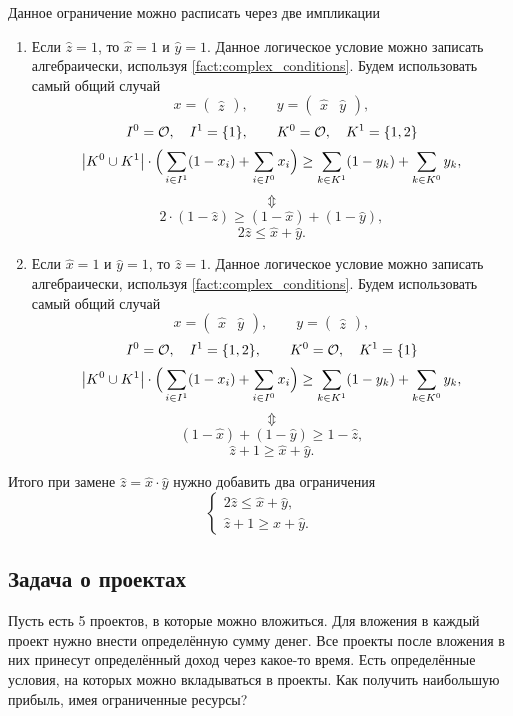 Данное ограничение можно расписать через две импликации
\begin{enumerate}
	\item Если $\hat{z} = 1$, то $\hat{x} = 1$ и $\hat{y} = 1$. Данное логическое условие можно записать алгебраически, используя \cref{fact:complex_conditions}. Будем использовать самый общий случай
	\[
	x = \begin{pmatrix}\hat{z}\end{pmatrix}, \qquad y = \begin{pmatrix} \hat{x} & \hat{y} \end{pmatrix},
	\]
	\[
	I^0 = \mathcal{O}, \quad I^1 = \{1\}, \qquad K^0 = \mathcal{O}, \quad K^1 = \{1, 2\}
	\]
	\[
	\abs{K^0 \cup K^1} \cdot \Big(\sum_{i \in I^1}(1-x_i) + \sum_{i \in I^0}x_i\Big) \ge \sum_{k \in K^1}(1-y_k) + \sum_{k \in K^0}y_k,
	\]	
	\[\Updownarrow\]	
	\[
	2 \cdot (1 - \hat{z}) \ge (1 - \hat{x}) + (1 - \hat{y}),
	\]
	\[
	2\hat{z} \le \hat{x} + \hat{y}.
	\]
	
	\item Если $\hat{x} = 1$ и $\hat{y} = 1$, то $\hat{z} = 1$. Данное логическое условие можно записать алгебраически, используя \cref{fact:complex_conditions}. Будем использовать самый общий случай
	\[
	x = \begin{pmatrix}\hat{x} & \hat{y}\end{pmatrix}, \qquad y = \begin{pmatrix} \hat{z} \end{pmatrix},
	\]
	\[
	I^0 = \mathcal{O}, \quad I^1 = \{1, 2\}, \qquad K^0 = \mathcal{O}, \quad K^1 = \{1\}
	\]
	\[
	\abs{K^0 \cup K^1} \cdot \Big(\sum_{i \in I^1}(1-x_i) + \sum_{i \in I^0}x_i\Big) \ge \sum_{k \in K^1}(1-y_k) + \sum_{k \in K^0}y_k,
	\]
	\[\Updownarrow\]
	\[
	(1 - \hat{x}) + (1 - \hat{y}) \ge 1 - \hat{z},
	\]
	\[
	\hat{z} + 1 \ge \hat{x} + \hat{y}.
	\]
\end{enumerate}

Итого при замене $\hat{z} = \hat{x} \cdot \hat{y}$ нужно добавить два ограничения
\[
\boxed{\begin{cases}
		2\hat{z} \le \hat{x} + \hat{y}, \\
		\hat{z} + 1 \ge \hat{x} + \hat{y}.
\end{cases}}
\]

\subsection{Задача о проектах}

\problem[о проектах]

Пусть есть 5 проектов, в которые можно вложиться. Для вложения в каждый проект нужно внести определённую сумму денег. Все проекты после вложения в них принесут определённый доход через какое-то время. Есть определённые условия, на которых можно вкладываться в проекты. Как получить наибольшую прибыль, имея ограниченные ресурсы?

